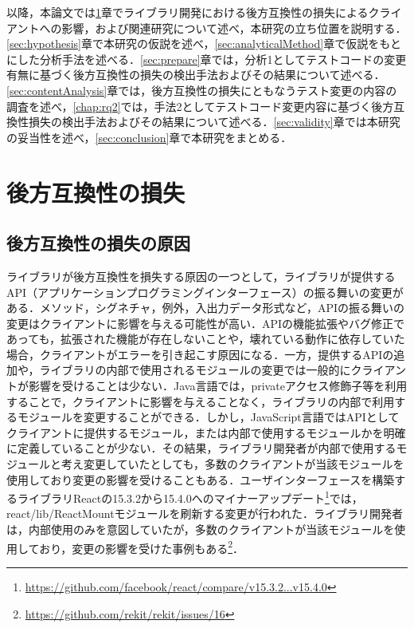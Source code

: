 \documentclass[submit]{ipsj}
\begin{document}
以降，本論文では\ref{sec:backward-compatibility}章でライブラリ開発における後方互換性の損失によるクライアントへの影響，および関連研究について述べ，本研究の立ち位置を説明する．\ref{sec:hypothesis}章で本研究の仮説を述べ，\ref{sec:analyticalMethod}章で仮説をもとにした分析手法を述べる．\ref{sec:prepare}章では，分析1としてテストコードの変更有無に基づく後方互換性の損失の検出手法およびその結果について述べる．\ref{sec:contentAnalysis}章では，後方互換性の損失にともなうテスト変更の内容の調査を述べ，\ref{chap:rq2}では，手法2としてテストコード変更内容に基づく後方互換性損失の検出手法およびその結果について述べる．\ref{sec:validity}章では本研究の妥当性を述べ，\ref{sec:conclusion}章で本研究をまとめる．

\section{後方互換性の損失}\label{sec:backward-compatibility}

\subsection{後方互換性の損失の原因}
ライブラリが後方互換性を損失する原因の一つとして，ライブラリが提供するAPI（アプリケーションプログラミングインターフェース）の振る舞いの変更がある．メソッド，シグネチャ，例外，入出力データ形式など，APIの振る舞いの変更はクライアントに影響を与える可能性が高い．APIの機能拡張やバグ修正であっても，拡張された機能が存在しないことや，壊れている動作に依存していた場合，クライアントがエラーを引き起こす原因になる．一方，提供するAPIの追加や，ライブラリの内部で使用されるモジュールの変更では一般的にクライアントが影響を受けることは少ない．Java言語では，privateアクセス修飾子等を利用することで，クライアントに影響を与えることなく，ライブラリの内部で利用するモジュールを変更することができる．しかし，JavaScript言語ではAPIとしてクライアントに提供するモジュール，または内部で使用するモジュールかを明確に定義していることが少ない．その結果，ライブラリ開発者が内部で使用するモジュールと考え変更していたとしても，多数のクライアントが当該モジュールを使用しており変更の影響を受けることもある．ユーザインターフェースを構築するライブラリReactの15.3.2から15.4.0へのマイナーアップデート\footnote{\url{https://github.com/facebook/react/compare/v15.3.2...v15.4.0}}では，react/lib/ReactMountモジュールを刷新する変更が行われた．ライブラリ開発者は，内部使用のみを意図していたが，多数のクライアントが当該モジュールを使用しており，変更の影響を受けた事例もある\footnote{\url{https://github.com/rekit/rekit/issues/16}}．
\end{document}
